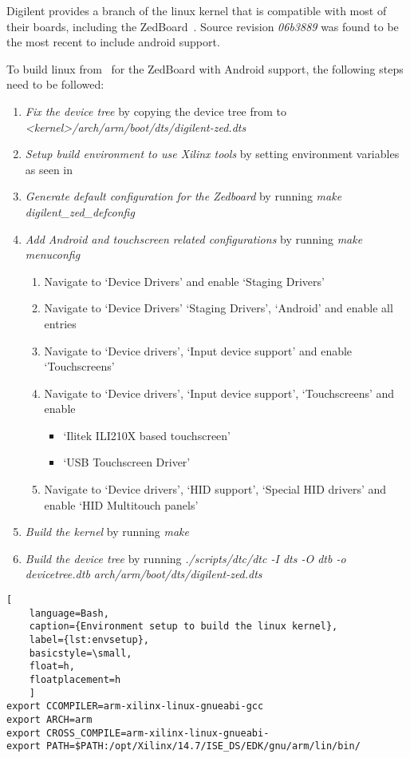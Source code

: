 Digilent provides a branch of the linux kernel that is compatible with most of
their boards, including the ZedBoard~\cite{DigilentLinux}.
Source revision \emph{06b3889} was found to be the most recent to include
android support.

To build linux from~\cite{DigilentLinux} for the ZedBoard with Android support,
the following steps need to be followed:
\begin{enumerate}
	\item \emph{Fix the device tree} by copying the device tree from
		\cite{DigilentReferenceDesign} to
		\emph{<kernel>/arch/arm/boot/dts/digilent-zed.dts}
	\item \emph{Setup build environment to use Xilinx tools} by setting
		environment variables as seen in 
	\item \emph{Generate default configuration for the Zedboard} by running
		\emph{make digilent\_zed\_defconfig}
	\item \emph{Add Android and touchscreen related configurations} by running
		\emph{make menuconfig}
		\begin{enumerate}
			\item Navigate to `Device Drivers' and enable `Staging Drivers'
			\item Navigate to `Device Drivers' `Staging Drivers', `Android'
				and enable all entries
			\item Navigate to `Device drivers', `Input device support' and
				enable `Touchscreens'
			\item Navigate to `Device drivers', `Input device support',
				`Touchscreens' and enable
				\begin{itemize}
					\item `Ilitek ILI210X based touchscreen'
					\item `USB Touchscreen Driver'
				\end{itemize}
			\item Navigate to `Device drivers', `HID support', `Special HID
				drivers' and enable `HID Multitouch panels'
		\end{enumerate}
	\item \emph{Build the kernel} by running \emph{make}
	\item \emph{Build the device tree} by running \emph{./scripts/dtc/dtc -I dts
		-O dtb -o devicetree.dtb arch/arm/boot/dts/digilent-zed.dts}
\end{enumerate}
\begin{lstlisting}[
	language=Bash,
	caption={Environment setup to build the linux kernel},
	label={lst:envsetup},
	basicstyle=\small,
	float=h,
	floatplacement=h
	]
export CCOMPILER=arm-xilinx-linux-gnueabi-gcc
export ARCH=arm
export CROSS_COMPILE=arm-xilinx-linux-gnueabi-
export PATH=$PATH:/opt/Xilinx/14.7/ISE_DS/EDK/gnu/arm/lin/bin/		
\end{lstlisting}
